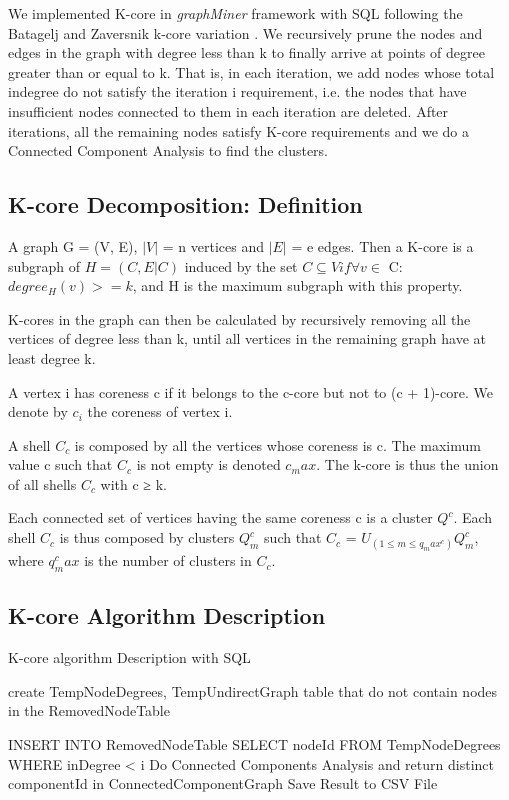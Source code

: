 We implemented K-core in {\em graphMiner} framework with SQL following the Batagelj and Zaversnik k-core variation \cite{Ignacio2005}. We recursively prune the nodes and edges in the graph with degree less than k to finally arrive at points of degree greater than or equal to k. That is, in each iteration, we add nodes whose total indegree do not satisfy the iteration i requirement, i.e. the nodes that have insufficient nodes connected to them in each iteration are deleted.
After iterations, all the remaining nodes satisfy K-core requirements and we do a Connected Component Analysis to find the clusters.

\subsection{K-core Decomposition: Definition}

A graph G = (V, E), $|V|$ = n vertices and $|E|$ = e edges. Then a K-core is a subgraph of $H =  (C, E | C)$ induced by the set $C \subseteq V if \forall v \in$ C: $degree_H(v) >= k$, and H is the maximum subgraph with this property.

K-cores in the graph can then be calculated by recursively removing all the vertices of degree less than k, until all vertices in the remaining graph have at least degree k.

A vertex i has coreness c if it belongs to the c-core but not to (c + 1)-core. We denote by $c_i$ the coreness of vertex i.

A shell $C_c$ is composed by all the vertices whose coreness is c. The maximum value c such that $C_c$ is not empty is denoted $c_max$. The k-core is thus the union of all shells $C_c$ with c ≥ k.

Each connected set of vertices having the same coreness c is a cluster $Q^c$. Each shell $C_c$ is thus composed by clusters $Q^c_m$ such that $C_c$ = $U_(1≤m≤q_max^c)Q^c_m$, where $q^c_max$ is the number of clusters in $C_c$.

\subsection{K-core Algorithm Description}

\begin{algorithm}
  \caption{K-core algorithm Description with SQL}
  \begin{algorithmic}[1]
    \Statex
      
create TempNodeDegrees, TempUndirectGraph table that do not contain nodes in the RemovedNodeTable
        
INSERT INTO RemovedNodeTable SELECT nodeId FROM TempNodeDegrees  WHERE inDegree <  i
      \EndFor
Do Connected Components Analysis and return distinct componentId in ConnectedComponentGraph
      \State 
Save Result to CSV File
    \EndFunction
  \end{algorithmic}
\end{algorithm}

